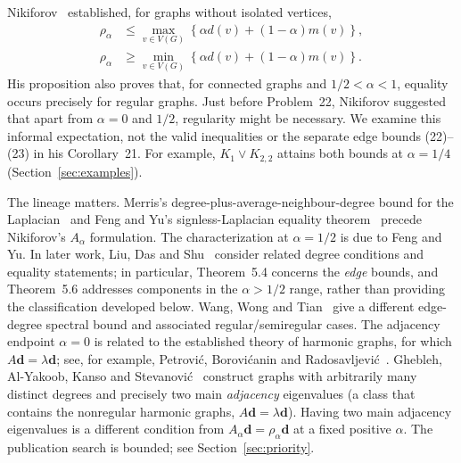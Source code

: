 \documentclass[11pt]{amsart}
\theoremstyle{remark}
\newcommand{\dd}{\boldsymbol{d}}
\begin{document}
Nikiforov~\cite[Proposition~20, (20)--(21)]{Nikiforov2017} established,
for graphs without isolated vertices,
\begin{align}
 \rho_\alpha&\leq\max_{v\in V(G)}
       \left\{\alpha d(v)+(1-\alpha)m(v)\right\},\tag{20}\label{eq:upper}\\
 \rho_\alpha&\geq\min_{v\in V(G)}
       \left\{\alpha d(v)+(1-\alpha)m(v)\right\}.\tag{21}\label{eq:lower}
\end{align}
His proposition also proves that, for connected graphs and
$1/2<\alpha<1$, equality occurs precisely for regular graphs. Just before
Problem~22, Nikiforov suggested that apart from $\alpha=0$ and $1/2$,
regularity might be necessary. We examine this informal expectation, not the
valid inequalities or the separate edge bounds (22)--(23) in his
Corollary~21. For example, $K_1\vee K_{2,2}$ attains both bounds at
$\alpha=1/4$ (Section~\ref{sec:examples}).

The lineage matters. Merris's degree-plus-average-neighbour-degree bound
for the Laplacian~\cite{Merris1998} and Feng and Yu's signless-Laplacian
equality theorem~\cite[Lemma~2.3]{FengYu2009} precede Nikiforov's
$A_\alpha$ formulation. The characterization at $\alpha=1/2$
is due to Feng and Yu. In later work,
Liu, Das and Shu~\cite[Lemmas~2.9--2.10 and Theorems~5.4--5.6]{LiuDasShu2020}
consider related degree conditions and equality statements; in particular,
Theorem~5.4 concerns the \emph{edge} bounds, and Theorem~5.6 addresses
components in the $\alpha>1/2$ range, rather than providing the
classification developed below. Wang, Wong and
Tian~\cite{WangWongTian2020} give a different edge-degree spectral bound
and associated regular/semiregular cases. The adjacency endpoint $\alpha=0$
is related to the established theory of harmonic graphs, for which
$A\dd=\lambda\dd$; see, for example,
Petrovi\'c, Borovi\'canin and Radosavljevi\'c~\cite{Petrovic2006}.
Ghebleh, Al-Yakoob, Kanso and Stevanovi\'c~\cite{GheblehEtAl2025}
construct graphs with arbitrarily many distinct degrees and precisely two
main \emph{adjacency} eigenvalues (a class that contains the nonregular
harmonic graphs, $A\dd=\lambda\dd$). Having two main adjacency
eigenvalues is a different condition from $A_\alpha\dd=\rho_\alpha\dd$
at a fixed positive $\alpha$. The publication search is bounded; see
Section~\ref{sec:priority}.
\end{document}
